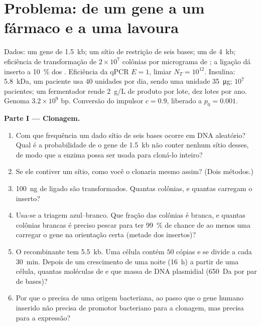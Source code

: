 \section{Problema: de um gene a um fármaco e a uma lavoura}

\begin{problem}
\label{pb:b3:genetic-engineering:1}
Dados: um gene de \qty{1.5}{kb}; um sítio de restrição de seis bases;
um  de \qty{4}{kb}; eficiência de transformação de
$2\times 10^{7}$ colônias por micrograma de ; a ligação dá
inserto a \qty{10}{\%} dos . Eficiência da qPCR $E = 1$,
limiar $N_{T} = 10^{12}$. Insulina: \qty{5.8}{kDa}, um paciente usa
$40$ unidades por dia, sendo uma unidade \qty{35}{\micro g}; $10^{7}$
pacientes; um fermentador rende \qty{2}{g/L} de produto por lote, dez
lotes por ano. Genoma $3.2\times
10^{9}$ bp. Conversão do impulsor
$c = 0.9$, liberado a $p_{0} = 0.001$.

\medskip
\noindent\textbf{Parte I --- Clonagem.}
\begin{enumerate}
  \item Com que frequência um dado sítio de seis bases ocorre em DNA
        aleatório? Qual é a probabilidade de o gene de \qty{1.5}{kb}
        não conter nenhum sítio desses, de modo que a enzima possa ser
        usada para cloná-lo inteiro?
  \item Se ele contiver um sítio, como você o clonaria mesmo assim?
        (Dois métodos.)
  \item \qty{100}{ng} de  ligado são transformados. Quantas
        colônias, e quantas carregam o inserto?
  \item Usa-se a triagem azul--branco. Que fração das colônias é
        branca, e quantas colônias brancas é preciso pescar para ter
        \qty{99}{\%} de chance de ao menos uma carregar o gene na
        orientação certa (metade dos insertos)?
  \item O  recombinante tem \qty{5.5}{kb}. Uma célula contém
        $50$ cópias e se divide a cada \qty{30}{min}. Depois de um
        crescimento de uma noite (\qty{16}{h}) a partir de uma célula,
        quantas moléculas de  e que massa de DNA plasmidial
        (\qty{650}{Da} por par de bases)?
  \item Por que o  precisa de uma origem bacteriana, ao passo
        que o gene humano inserido não precisa de promotor bacteriano
        para a clonagem, mas precisa para a expressão?
\end{enumerate}


\end{problem}
